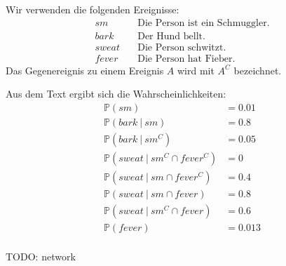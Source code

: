 \documentclass[a4paper]{scrartcl}
\newcommand{\prob}{\mathbb{P}}
\begin{document}
Wir verwenden die folgenden Ereignisse:
\begin{align*}
    sm &\quad \text{Die Person ist ein Schmuggler.} \\
    bark &\quad \text{Der Hund bellt.} \\
    sweat &\quad \text{Die Person schwitzt.} \\
    fever &\quad \text{Die Person hat Fieber.}
\end{align*}
Das Gegenereignis zu einem Ereignis $A$ wird mit $A^C$ bezeichnet.

Aus dem Text ergibt sich die Wahrscheinlichkeiten:
\begin{align*}
    \prob(sm) &= \num{0,01} \\
    \prob(bark\ |\ sm) &= \num{0,8} \\
    \prob(bark\ |\ sm^C) &= \num{0,05} \\
    \prob(sweat\ |\ sm^C \cap fever^C) &= \num{0} \\
    \prob(sweat\ |\ sm \cap fever^C) &= \num{0.4} \\
    \prob(sweat\ |\ sm \cap fever) &= \num{0.8} \\
    \prob(sweat\ |\ sm^C \cap fever) &= \num{0.6} \\
    \prob(fever) &= \num{0,013} \\
\end{align*}

TODO: network
\end{document}
